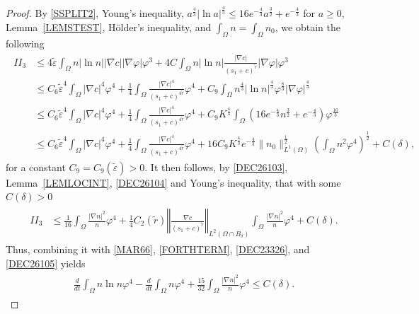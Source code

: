 \documentclass{amsart}
\numberwithin{equation}{section}
\newcommand{\R}{{ \mathbb{R}  }}
\newcommand{\bke}[1]{\left( #1 \right)}
\newcommand{\norm}[1]{\left\Vert #1 \right\Vert}
\begin{document}
\begin{proof}
By \eqref{SSPLIT2}, Young's inequality, $a^{\frac{4}{3}}|\ln a|^{\frac{4}{3}}\le 16e^{-\frac{4}{3}} a^{\frac{3}{2}}+e^{-\frac{4}{3}}$ for $a\ge0$, Lemma~\ref{LEMSTEST}, H\"older's inequality, and $\int_{\Omega}n=\int_{\Omega}n_{0}$, we obtain the following
\begin{align*}
\begin{aligned}
II_3
&\le  4\tilde{\varepsilon}\int_{\Omega} n|\ln n| |\nabla c||\nabla \varphi| \varphi^{3}+ 4C\int_{\Omega} n|\ln n| \frac{|\nabla c|}{(s_{1}+c)^{\tilde{r}}}|\nabla \varphi| \varphi^{3}
\\&
\le C_{6}\tilde{\varepsilon}^{4}\int_{\Omega} |\nabla c|^{4} \varphi^{4}+\frac{1}{4}\int_{\Omega}\frac{|\nabla c|^{4}}{(s_{1}+c)^{4\tilde{r}}}\varphi^{4}+C_{9}\int_{\Omega} n^{\frac{4}{3}}|\ln n|^{\frac{4}{3}}\varphi^{\frac{8}{3}}|\nabla \varphi|^{\frac{4}{3}}
\\&
\le  C_{6}\tilde{\varepsilon}^{4}\int_{\Omega}|\nabla c|^{4}\varphi^{4}+\frac{1}{4}\int_{\Omega}\frac{|\nabla c|^{4}}{(s_{1}+c)^{4\tilde{r}}}\varphi^{4}+C_{9}K^{\frac{4}{3}}\int_{\Omega} (16e^{-\frac{4}{3}} n^{\frac{3}{2}}+e^{-\frac{4}{3}})\varphi^{\frac{10}{3}} 
\\&
\le C_{6}\tilde{\varepsilon}^{4}\int_{\Omega}|\nabla c|^{4}\varphi^{4}
+\frac{1}{4}\int_{\Omega}\frac{|\nabla c|^{4}}{(s_{1}+c)^{4\tilde{r}}}\varphi^{4}
+16 C_{9}K^{\frac{4}{3}} e^{-\frac{4}{3}}\|n_{0}\|_{L^{1}(\Omega)}^{\frac{1}{2}}\bke{\int_{\Omega}n^{2}\varphi^{4}}^{\frac{1}{2}} 
+ C(\delta),
\end{aligned}
\end{align*}
for a constant $C_{9}= C_{9}(\tilde{\varepsilon})>0$. It then follows, by \eqref{DEC26103}, Lemma~\ref{LEMLOCINT}, \eqref{DEC26104} and Young's inequality, that with some $C(\delta)>0$ 
\begin{align*}
\begin{aligned}
II_3
&\le \frac{1}{16}\int_{\Omega} \frac{|\nabla n|^{2}}{n}\varphi^{4}+\frac{1}{4}C_{2}(\tilde{r})  \norm{\frac{\nabla c}{(s_{1}+c)^{\tilde{r}}}}_{L^{2}(\Omega\cap B_{\delta})}\int_{\Omega} \frac{|\nabla n|^{2}}{n}\varphi^{4} 
+C(\delta).
\end{aligned}
\end{align*}
Thus, combining it with \eqref{MAR66}, \eqref{FORTHTERM}, \eqref{DEC23326}, and \eqref{DEC26105} yields  
\begin{align*}
\begin{aligned}
\frac{d}{dt} \int_{\Omega}  n\ln n\varphi^{4}-\frac{d}{dt}\int_{\Omega}n\varphi^{4} +\frac{15}{32}\int_{\Omega} \frac{|\nabla n|^{2}}{n}\varphi^{4}
\le C(\delta).
\end{aligned}
\end{align*}


\end{proof}
\end{document}
